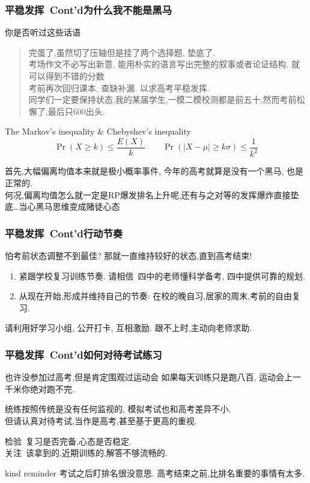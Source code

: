\documentclass[10pt]{beamer}
\begin{document}
\begin{frame}
	\frametitle{平稳发挥\ Cont'd\qquad 为什么我不能是黑马}
	你是否听过这些话语

	\begin{quote}
		完蛋了,虽然切了压轴但是挂了两个选择题, 垫底了.\\
		考场作文不必写出新意, 能用朴实的语言写出完整的叙事或者论证结构, 就可以得到不错的分数\\
		考前再次回归课本, 查缺补漏. 以求高考平稳发挥.\\
		同学们一定要保持状态,我的某届学生,一模二模校测都是前五十,然而考前松懈了,最后只600出头.\\
	\end{quote}

	\pause{}

	\begin{block}{The Markov's inequality \& Chebyshev's inequality}
		\[
			\Pr{\left(X\geqslant k\right)}\leqslant \frac{E(X)}{k}
			\qquad
			\Pr{\left(\left\vert X-\mu \right\vert \geqslant k\sigma\right)} \leqslant \frac{1}{k^2}
		\]
	\end{block}
	首先,大幅偏离均值本来就是极小概率事件, 今年的高考就算是没有一个黑马, 也是正常的.\\
	何况,偏离均值怎么就一定是RP爆发排名上升呢,还有与之对等的发挥爆炸直接垫底\ldots 当心黑马思维变成赌徒心态\\
\end{frame}


\begin{frame}
	\frametitle{平稳发挥\ Cont'd\qquad 行动节奏}
	怕考前状态调整不到最佳? 那就一直维持较好的状态,直到高考结束!
	\pause{}
	\begin{enumerate}
		\item 紧跟学校复习训练节奏. 请相信\, 四中的老师懂科学备考, 四中提供可靠的规划.
		\item 从现在开始,形成并维持自己的节奏: 在校的晚自习,居家的周末,考前的自由复习.
	\end{enumerate}
	\pause{}
  请利用好学习小组, 公开打卡, 互相激励. 跟不上时,主动向老师求助.
\end{frame}


\begin{frame}
	\frametitle{平稳发挥\ Cont'd\qquad 如何对待考试练习}
	\begin{block}{也许没参加过高考,但是肯定围观过运动会}
		如果每天训练只是跑八百, 运动会上一千米你绝对跑不完.
	\end{block}
	统练按照传统是没有任何监视的, 模拟考试也和高考差异不小. \\
	但请认真对待考试,当作是高考,甚至基于更高的重视.\\
	\vspace{0.3em} \pause{}

	检验\ 复习是否完备,心态是否稳定.\\
  关注\ 该拿到的,近期训练的,解答不够流畅的.\\
	\vspace{0.3em} \pause{}
	\begin{alertblock}{kind reminder}
		考试之后盯排名很没意思. 高考结束之前,比排名重要的事情有太多.
	\end{alertblock}
\end{frame}
\end{document}
